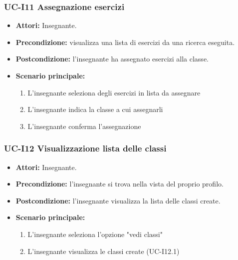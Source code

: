 \subsubsection{UC-I11 Assegnazione esercizi}
\begin{itemize}
	\item \textbf{Attori:} Insegnante.
	\item \textbf{Precondizione:} visualizza una lista di esercizi da una ricerca eseguita.
	\item \textbf{Postcondizione:} l'insegnante ha assegnato esercizi alla classe.
	\item \textbf{Scenario principale:}
	\begin{enumerate}
		\item L'insegnante seleziona degli esercizi in lista da assegnare
		\item L'insegnante indica la classe a cui assegnarli
		\item L'insegnante conferma l'assegnazione
	\end{enumerate}
\end{itemize}

\subsubsection{UC-I12 Visualizzazione lista delle classi}		
\begin{itemize}
	\item \textbf{Attori:} Insegnante.
	\item \textbf{Precondizione:} l'insegnante si trova nella vista del proprio profilo.
	\item \textbf{Postcondizione:} l'insegnante visualizza la lista delle classi create.
	\item \textbf{Scenario principale:}
	\begin{enumerate}
		\item L'insegnante seleziona l'opzione "vedi classi"
		\item L'insegnante visualizza le classi create (UC-I12.1)
	\end{enumerate}		
\end{itemize}


